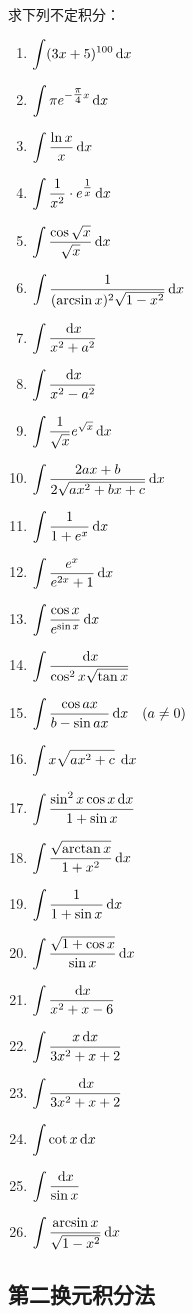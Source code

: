 \begin{ex}
求下列不定积分：
\begin{enumerate}
\item  $\displaystyle\int(3 x+5)^{100} \,{\rm d} x$
\item  $\displaystyle\int\pi e^{-\tfrac{\pi}{4} x} \,{\rm d} x$
\item  $\displaystyle\int \dfrac{\ln x}{x} \,{\rm d} x$
\item  $\displaystyle\int\dfrac{1}{x^{2}} \cdot e^{\tfrac{1}{x}} \,{\rm d} x$
\item  $\displaystyle\int\dfrac{\cos \sqrt{x}}{\sqrt{x}} \,{\rm d} x$
\item  $\displaystyle\int \dfrac{1}{(\arcsin x)^{2} \sqrt{1-x^{2}}} \,{\rm d} x$
\item  $\displaystyle\int\dfrac{\,{\rm d} x}{x^{2}+a^{2}}$
\item  $\displaystyle\int \dfrac{\,{\rm d} x}{x^{2}-a^{2}}$
\item  $\displaystyle\int \dfrac{1}{\sqrt{x}} e^{\sqrt{x}} \,{\rm d} x$
\item  $\displaystyle\int \dfrac{2 a x+b}{2 \sqrt{a x^{2}+b x+c}} \,{\rm d} x$
\item  $\displaystyle\int\dfrac{1}{1+e^{x}} \,{\rm d} x$
\item  $\displaystyle\int \dfrac{e^{x}}{e^{2 x}+1} \,{\rm d} x$    
\item $\displaystyle\int \dfrac{\cos x}{e^{\sin x}} \,{\rm d} x$
\item $\displaystyle\int \dfrac{\,{\rm d} x}{\cos ^{2} x \sqrt{\tan x}}$
\item $\displaystyle\int  \dfrac{\cos a x}{b-\sin a x} \,{\rm d} x\quad (a \neq 0) $
\item $\displaystyle\int x \sqrt{a x^{2}+c}\; \,{\rm d} x$
\item $\displaystyle\int \dfrac{\sin ^{2} x \cos x \,{\rm d} x}{1+\sin x}$
\item $\displaystyle\int \dfrac{\sqrt{\arctan x}}{1+x^{2}} \,{\rm d} x$
\item $\displaystyle\int \dfrac{1}{1+\sin x} \,{\rm d} x$
\item $\displaystyle\int \dfrac{\sqrt{1+\cos x}}{\sin x} \,{\rm d} x$
\item $\displaystyle\int \dfrac{\,{\rm d} x}{x^{2}+x-6}$
\item $\displaystyle\int \dfrac{x \,{\rm d} x}{3 x^{2}+x+2}$
\item $\displaystyle\int  \dfrac{\,{\rm d} x}{3 x^{2}+x+2}$
\item $\displaystyle\int  \cot x \,{\rm d} x$
\item $\displaystyle\int  \dfrac{\,{\rm d} x}{\sin x}$
\item $\displaystyle\int \dfrac{\arcsin x}{\sqrt{1-x^{2}}} \,{\rm d} x$
\end{enumerate}
\end{ex}

\subsection{第二换元积分法}


